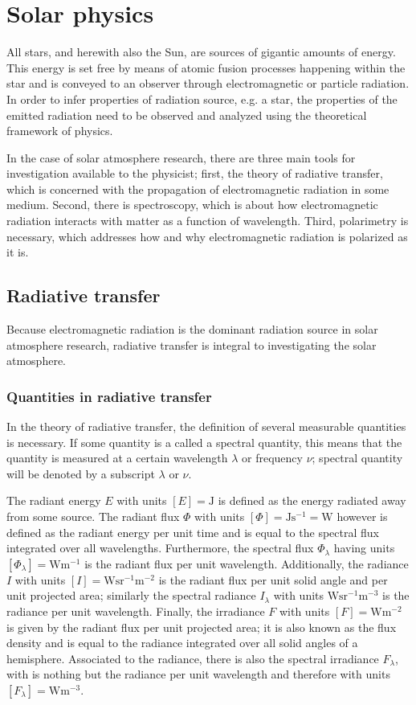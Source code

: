 \documentclass[a4paper,12pt]{report}
\begin{document}
\chapter{Solar physics}
All stars, and herewith also the Sun, are sources of gigantic amounts of energy. This energy is set free by means of atomic fusion processes happening within the star and is conveyed to an observer through electromagnetic or particle radiation. In order to infer properties of radiation source, e.g. a star, the properties of the emitted radiation need to be observed and analyzed using the theoretical framework of physics. 

In the case of solar atmosphere research, there are three main tools for investigation available to the physicist; first, the theory of radiative transfer, which is concerned with the propagation of electromagnetic radiation in some medium. Second, there is spectroscopy, which is about how electromagnetic radiation interacts with matter as a function of wavelength. Third, polarimetry is necessary, which addresses how and why electromagnetic radiation is polarized as it is.

\section{Radiative transfer}
Because electromagnetic radiation is the dominant radiation source in solar atmosphere research, radiative transfer is integral to investigating the solar atmosphere.

\subsection{Quantities in radiative transfer}
In the theory of radiative transfer, the definition of several measurable quantities is necessary. If some quantity is a called a spectral quantity, this means that the quantity is measured at a certain wavelength $\lambda$ or frequency $\nu$; spectral quantity will be denoted by a subscript $\lambda$ or $\nu$. 

The radiant energy $E$ with units $[E] = \si{\joule}$ is defined as the energy radiated away from some source. The radiant flux $\Phi$ with units $[\Phi] = \si{\joule\second^{-1}=\watt}$ however is defined as the radiant energy per unit time and is equal to the spectral flux integrated over all wavelengths. Furthermore, the spectral flux $\Phi_\lambda$ having units $[\Phi_\lambda] = \si{\watt\meter^{-1}}$ is the radiant flux per unit wavelength. Additionally, the radiance $I$ with units $[I]=\si{\watt\steradian^{-1}\meter^{-2}}$ is the radiant flux per unit solid angle and per unit projected area; similarly the spectral radiance $I_\lambda$ with units $\si{\watt\steradian^{-1}\meter^{-3}}$ is the radiance per unit wavelength. Finally, the irradiance $F$ with units $[F] = \si{\watt\meter^{-2}}$ is given by the radiant flux per unit projected area; it is also known as the flux density and is equal to the radiance integrated over all solid angles of a hemisphere. Associated to the radiance, there is also the spectral irradiance $F_{\lambda}$, with is nothing but the radiance per unit wavelength and therefore with units $[F_{\lambda}]=\si{\watt\meter^{-3}}$.
\end{document}
